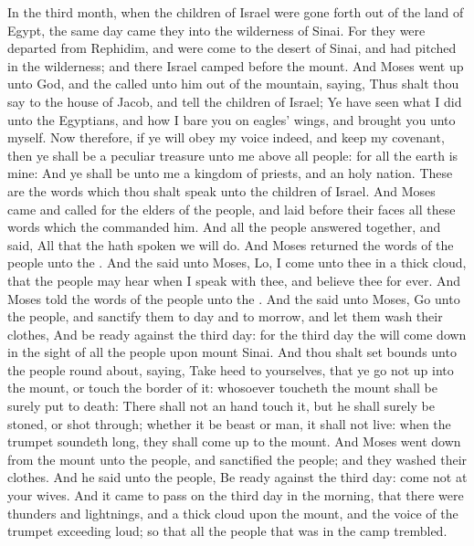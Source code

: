 \begin{biblechapter} %
 In the third month, when the children of Israel were gone forth out of the land of Egypt, the same day came they into the wilderness of Sinai.
\verse For they were departed from Rephidim, and were come to the desert of Sinai, and had pitched in the wilderness; and there Israel camped before the mount.
\verse And Moses went up unto God, and the \LORD called unto him out of the mountain, saying, Thus shalt thou say to the house of Jacob, and tell the children of Israel;
\verse Ye have seen what I did unto the Egyptians, and how I bare you on eagles' wings, and brought you unto myself.
\verse Now therefore, if ye will obey my voice indeed, and keep my covenant, then ye shall be a peculiar treasure unto me above all people: for all the earth is mine:
\verse And ye shall be unto me a kingdom of priests, and an holy nation. These are the words which thou shalt speak unto the children of Israel.
\verse And Moses came and called for the elders of the people, and laid before their faces all these words which the \LORD commanded him.
\verse And all the people answered together, and said, All that the \LORD hath spoken we will do. And Moses returned the words of the people unto the \LORD.
\verse And the \LORD said unto Moses, Lo, I come unto thee in a thick cloud, that the people may hear when I speak with thee, and believe thee for ever. And Moses told the words of the people unto the \LORD.
\verse And the \LORD said unto Moses, Go unto the people, and sanctify them to day and to morrow, and let them wash their clothes,
\verse And be ready against the third day: for the third day the \LORD will come down in the sight of all the people upon mount Sinai.
\verse And thou shalt set bounds unto the people round about, saying, Take heed to yourselves, that ye go not up into the mount, or touch the border of it: whosoever toucheth the mount shall be surely put to death:
\verse There shall not an hand touch it, but he shall surely be stoned, or shot through; whether it be beast or man, it shall not live: when the trumpet soundeth long, they shall come up to the mount.
\verse And Moses went down from the mount unto the people, and sanctified the people; and they washed their clothes.
\verse And he said unto the people, Be ready against the third day: come not at your wives.
\verse And it came to pass on the third day in the morning, that there were thunders and lightnings, and a thick cloud upon the mount, and the voice of the trumpet exceeding loud; so that all the people that was in the camp trembled.

\end{biblechapter}
